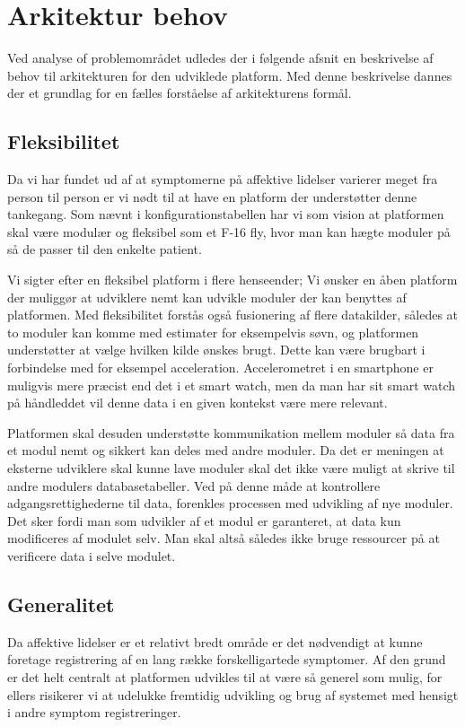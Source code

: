 \section{Arkitektur behov}\label{arkitekturkrav}
Ved analyse of problemområdet udledes der i følgende afsnit en beskrivelse af behov til arkitekturen for den udviklede platform.
Med denne beskrivelse dannes der et grundlag for en fælles forståelse af arkitekturens formål.

\subsection{Fleksibilitet}
Da vi har fundet ud af at symptomerne på affektive lidelser varierer meget fra person til person er vi nødt til at have en platform der understøtter denne tankegang.
Som nævnt i konfigurationstabellen har vi som vision at platformen skal være modulær og fleksibel som et F-16 fly, hvor man kan hægte moduler på så de passer til den enkelte patient.

Vi sigter efter en fleksibel platform i flere henseender;
Vi ønsker en åben platform der muliggør at udviklere nemt kan udvikle moduler der kan benyttes af platformen.
Med fleksibilitet forstås også fusionering af flere datakilder, således at to moduler kan komme med estimater for eksempelvis søvn, og platformen understøtter at vælge hvilken kilde ønskes brugt.
Dette kan være brugbart i forbindelse med for eksempel acceleration.
Accelerometret i en smartphone er muligvis mere præcist end det i et smart watch, men da man har sit smart watch på håndleddet vil denne data i en given kontekst være mere relevant.

Platformen skal desuden understøtte kommunikation mellem moduler så data fra et modul nemt og sikkert kan deles med andre moduler.
Da det er meningen at eksterne udviklere skal kunne lave moduler skal det ikke være muligt at skrive til andre modulers databasetabeller.
Ved på denne måde at kontrollere adgangsrettighederne til data, forenkles processen med udvikling af nye moduler.
Det sker fordi man som udvikler af et modul er garanteret, at data kun modificeres af modulet selv.
Man skal altså således ikke bruge ressourcer på at verificere data i selve modulet.

\subsection{Generalitet}
Da affektive lidelser er et relativt bredt område er det nødvendigt at kunne foretage registrering af en lang række forskelligartede symptomer.
Af den grund er det helt centralt at platformen udvikles til at være så generel som mulig, for ellers risikerer vi at udelukke fremtidig udvikling og brug af systemet med hensigt i andre symptom registreringer.
